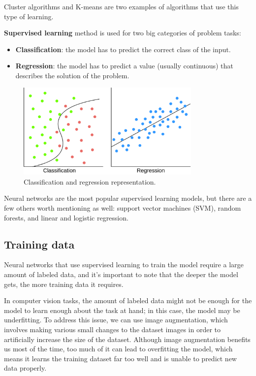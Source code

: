 \documentclass{report}[12pt, a4paper]
\begin{document}
Cluster algorithms and K-means are two examples of algorithms that use this type of learning.

\textbf{Supervised learning} method is used for two big categories of problem tasks:
\begin{itemize}
    \item \textbf{Classification}: the model has to predict the correct class of the input.
    \item \textbf{Regression}: the model has to predict a value (usually continuous) that describes the solution of the problem.
\end{itemize}

\begin{figure}[htp]
    \centering
    \includegraphics[width=9cm]{regression_classification_diagram}
    \caption{Classification and regression representation.}
    \label{fig:regression_classification_diagram}
\end{figure}


Neural networks are the most popular supervised learning models, but there are a few others worth mentioning as well: support vector machines (SVM), random forests, and linear and logistic regression.

\subsection{Training data}

Neural networks that use supervised learning to train the model require a large amount of labeled data, and it's important to note that the deeper the model gets, the more training data it requires.

In computer vision tasks, the amount of labeled data might not be enough for the model to learn enough about the task at hand; in this case, the model may be underfitting. To address this issue, we can use image augmentation, which involves making various small changes to the dataset images in order to artificially increase the size of the dataset. Although image augmentation benefits us most of the time, too much of it can lead to overfitting the model, which means it learns the training dataset far too well and is unable to predict new data properly.
\end{document}
